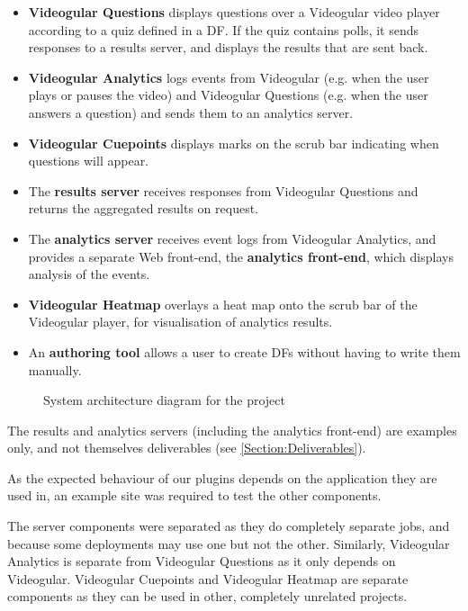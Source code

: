 \begin{itemize}
	\item
		\textbf{Videogular Questions} displays questions over a \gls{Videogular} video player according to a quiz defined in a \gls{DF}. If the quiz contains polls, it sends responses to a results server, and displays the results that are sent back.
	\item
		\textbf{Videogular Analytics} logs events from \gls{Videogular} (e.g. when the user plays or pauses the video) and Videogular Questions (e.g. when the user answers a question) and sends them to an analytics server.
	\item
		\textbf{Videogular Cuepoints} displays marks on the \gls{scrub bar} indicating when questions will appear.
	\item
		The \textbf{results server} receives responses from Videogular Questions and returns the aggregated results on request.
	\item
		The \textbf{analytics server} receives event logs from Videogular Analytics, and provides a separate Web front-end, the \textbf{analytics front-end}, which displays analysis of the events.
	\item
		\textbf{Videogular Heatmap} overlays a heat map onto the \gls{scrub bar} of the \gls{Videogular} player, for visualisation of analytics results.
	\item
		An \textbf{authoring tool} allows a user to create \glspl{DF} without having to write them manually.
\end{itemize}

\begin{figure}[h!]
	\centering
	
	\caption{System architecture diagram for the project \label{fig:System architecture diagram}}
\end{figure}

The results and analytics servers (including the analytics front-end) are examples only, and not themselves deliverables (see \autoref{Section:Deliverables}).

As the expected behaviour of our plugins depends on the application they are used in, an example site was required to test the other components.

The server components were separated as they do completely separate jobs, and because some deployments may use one but not the other. Similarly, Videogular Analytics is separate from Videogular Questions as it only depends on \gls{Videogular}. Videogular Cuepoints and Videogular Heatmap are separate components as they can be used in other, completely unrelated projects.

